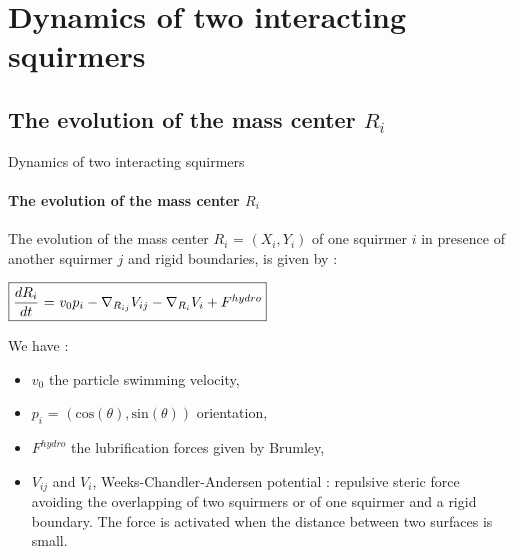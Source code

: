 \documentclass{beamer}
\begin{document}
\section{Dynamics of two interacting squirmers}
\subsection{The evolution of the mass center $R_i$}    
\begin{frame}{Dynamics of two interacting squirmers}
        \framesubtitle{The evolution of the mass center $R_i$}
        The evolution of the mass center $R_i$ = $(X_i, Y_i)$ of one squirmer $i$ in presence of 
    another squirmer $j$ and rigid boundaries, is given by :
    \begin{center}
    $\boxed{\frac{dR_i}{dt}$ = $v_0 p_i -  \nabla_{R_{ij}} V_{ij} - \nabla_{R_i} V_i + F^{hydro}}$
    \end{center}
    We have : \begin{itemize}
        \item $v_0$ the particle swimming velocity,
        \item $p_i$ = $(\mathrm{cos}(\theta),\mathrm{sin}(\theta))$ orientation,
        \item $F^{hydro}$ the lubrification forces given by Brumley\cite{Brumley},
        \item $V_{ij}$ and $V_i$, Weeks-Chandler-Andersen potential : repulsive steric force avoiding the overlapping of two squirmers or of one squirmer and a rigid boundary. The force is activated when the distance between two surfaces is small.
    \end{itemize}
\end{frame}
    
\end{document}
